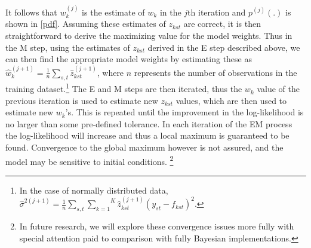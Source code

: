 \documentclass[12pt,fullpage]{article}
\newcommand{\note}[1]{\footnote{\doublespacing#1 \vspace{4 mm}}}
\begin{document}
It follows that $w_k^{(j)}$ is the estimate of $w_k$ in the $j$th
iteration and $p^{(j)}(.)$ is shown in \eqref{pdf}.  Assuming these
estimates of $z_{kst}$ are correct, it is then straightforward to
derive the maximizing value for the model weights. Thus in the M step, using the estimates of $z_{kst}$ derived in the E step described above, we can then find the appropriate model weights by estimating these as
$\hat{w}^{(j+1)}_k=\frac{1}{n}\underset{s,t}{\sum}\hat{z}^{(j+1)}_{kst}$,
where $n$ represents the number of observations in the training
dataset.\note{In the case of normally distributed data,
  $\hat{\sigma}^{2(j+1)}=\frac{1}{n}\underset{s,t}{\sum}\overset{K}{\underset{k=1}{\sum}}\hat{z}^{(j+1)}_{kst}(y_{st}-f_{kst})^2$.}
The E and M steps are then iterated, thus the $w_k$ value of the previous iteration is used to estimate new $z_{kst}$ values, which are then used to estimate new $w_{k}$'s. This is repeated until the improvement in the log-likelihood is no larger than some pre-defined
tolerance. In each iteration of the EM process the log-likelihood will increase and thus a local maximum is guaranteed to be found. Convergence to the global
  maximum however is not assured, and the model may be sensitive to initial
  conditions. \note{In future research, we will explore these convergence
  issues more fully with special attention paid to comparison with
  fully Bayesian implementations.}

\newpage
\singlespacing

 
%





\end{document}
